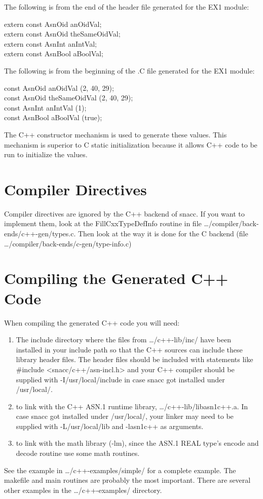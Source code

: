 The following is from the end of the header file generated for the EX1
module:
\begin{Ccode}
extern const AsnOid  \>\>\>anOidVal;\\
extern const AsnOid  \>\>\>theSameOidVal;\\
extern const AsnInt  \>\>\>anIntVal;\\
extern const AsnBool \>\>\>aBoolVal;
\end{Ccode}

The following is from the beginning of the {\ufn .C} file generated
for the EX1 module:
\begin{Ccode}
const AsnOid  \>\>\>anOidVal (2, 40, 29);\\
const AsnOid  \>\>\>theSameOidVal (2, 40, 29);\\
const AsnInt  \>\>\>anIntVal (1);\\
const AsnBool \>\>\>aBoolVal (true);
\end{Ccode}

The C++ constructor mechanism is used to generate these values.  This
mechanism is superior to C static initialization because it allows C++
code to be run to initialize the values.

\section{\label{compiler-dir-C++-section}Compiler Directives}
Compiler directives are ignored by the C++ backend of snacc.  If you want
to implement them, look at the {\C FillCxxTypeDefInfo} routine in
file {\ufn \dots/compiler/back-ends/c++-gen/types.c}.  Then look at the
way it is done for the C backend (file
{\ufn \dots/compiler/back-ends/c-gen/type-info.c})

\section{\label{compiling-gen-C++-section}Compiling the Generated C++ Code}

When compiling the generated C++ code you will need:
\begin{enumerate}
\item
  The include directory where the files from {\ufn \dots/c++-lib/inc/} have been installed in your include path so that the C++ sources can include these library header files.
  The header files should be included with statements like {\C \#include <snacc/c++/asn-incl.h>} and your C++ compiler should be supplied with {\ufn -I/usr/local/include} in case snacc got installed under {\ufn /usr/local/}.
\item
  to link with the C++ ASN.1 runtime library, {\ufn \dots/c++-lib/libasn1c++.a}.
  In case snacc got installed under {\ufn /usr/local/}, your linker may need to be supplied with {\ufn -L/usr/local/lib} and {\ufn -lasn1c++} as arguments.
\item
  to link with the math library ({\ufn -lm}), since the ASN.1 REAL type's encode and decode routine use some math routines.
\end{enumerate}

See the example in {\ufn \dots/c++-examples/simple/} for a complete
example. The makefile and main routines are probably the most
important.  There are several other examples in the
{\ufn \dots/c++-examples/} directory.
